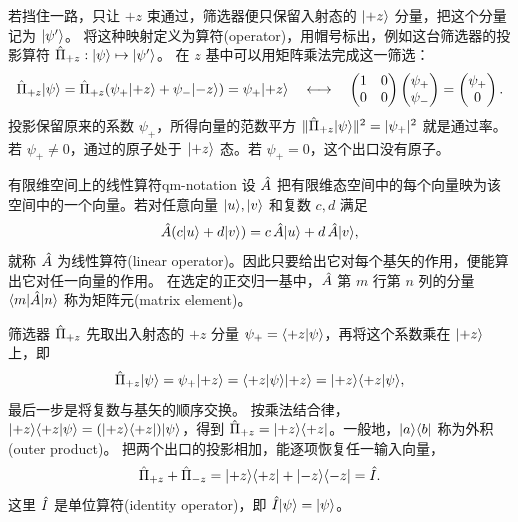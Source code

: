 若挡住一路，只让 $+z$ 束通过，筛选器便只保留入射态的 $\lvert+z\rangle$ 分量，把这个分量记为 $\lvert\psi'\rangle$。
将这种映射定义为算符(operator)，用帽号标出，例如这台筛选器的投影算符 $\hat{\Pi}_{+z}: \lvert\psi\rangle \mapsto \lvert\psi'\rangle$。
在 $z$ 基中可以用矩阵乘法完成这一筛选：
\begin{equation}
    \hat{\Pi}_{+z} \lvert\psi\rangle = \hat{\Pi}_{+z}(\psi_+\lvert+z\rangle + \psi_-\lvert-z\rangle) = \psi_+\lvert+z\rangle
    \quad \longleftrightarrow \quad
    \begin{pmatrix}1&0\\0&0\end{pmatrix}
    \begin{pmatrix}\psi_+\\\psi_-\end{pmatrix}
    = \begin{pmatrix}\psi_+\\0\end{pmatrix}.
\end{equation}
投影保留原来的系数 $\psi_+$，所得向量的范数平方 $\lVert\hat{\Pi}_{+z}\lvert\psi\rangle\rVert^2 = \lvert\psi_+\rvert^2$ 就是通过率。若 $\psi_+ \ne 0$，通过的原子处于 $\lvert+z\rangle$ 态。若 $\psi_+ = 0$，这个出口没有原子。

\begin{definition}{有限维空间上的线性算符}{qm-notation}
    设 $\hat{A}$ 把有限维态空间中的每个向量映为该空间中的一个向量。若对任意向量 $\lvert u\rangle,\lvert v\rangle$ 和复数 $c,d$ 满足
    \begin{equation}\label{eq:qm-operator-linearity}
        \hat{A}(c\lvert u\rangle + d\lvert v\rangle) = c\,\hat{A}\lvert u\rangle + d\,\hat{A}\lvert v\rangle,
    \end{equation}
    就称 $\hat{A}$ 为线性算符(linear operator)。因此只要给出它对每个基矢的作用，便能算出它对任一向量的作用。
    在选定的正交归一基中，$\hat{A}$ 第 $m$ 行第 $n$ 列的分量 $\langle m\vert\hat{A}\vert n\rangle$ 称为矩阵元(matrix element)。
\end{definition}

筛选器 $\hat{\Pi}_{+z}$ 先取出入射态的 $+z$ 分量 $\psi_+ = \langle+z\vert\psi\rangle$，再将这个系数乘在 $\lvert+z\rangle$ 上，即
\begin{equation}
    \hat{\Pi}_{+z}\lvert\psi\rangle = \psi_+\lvert+z\rangle = \langle+z\vert\psi\rangle\lvert+z\rangle = \lvert+z\rangle\langle+z\vert\psi\rangle,
\end{equation}
最后一步是将复数与基矢的顺序交换。
按乘法结合律，$\lvert+z\rangle\langle+z\vert\psi\rangle = (\lvert+z\rangle\langle+z\rvert)\lvert\psi\rangle$，得到 $\hat{\Pi}_{+z} = \lvert+z\rangle\langle+z\rvert$。一般地，$\lvert a\rangle\langle b\rvert$ 称为外积(outer product)。
把两个出口的投影相加，能逐项恢复任一输入向量，
\begin{equation}
    \hat{\Pi}_{+z} + \hat{\Pi}_{-z} = \lvert+z\rangle\langle+z\rvert + \lvert-z\rangle\langle-z\rvert = \hat{I} .
\end{equation}
这里 $\hat{I}$ 是单位算符(identity operator)，即 $\hat{I}\lvert\psi\rangle = \lvert\psi\rangle$。

